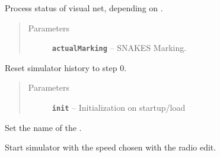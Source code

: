 \documentclass[a4paper,10pt,english]{sphinxmanual}
\begin{document}
\begin{fulllineitems}
\begin{fulllineitems}
\end{fulllineitems}


\begin{fulllineitems}
\label{model_link:model.CPNSimulator.CPNSimulator.getActualMarking}
Process status of visual net, depending on .
\begin{quote}\begin{description}
\item[{Parameters}] \leavevmode
\textbf{\texttt{actualMarking}} -- SNAKES Marking.

\end{description}\end{quote}

\end{fulllineitems}


\begin{fulllineitems}
\label{model_link:model.CPNSimulator.CPNSimulator.resetSimulator}
Reset simulator history to step 0.
\begin{quote}\begin{description}
\item[{Parameters}] \leavevmode
\textbf{\texttt{init}} -- Initialization on startup/load

\end{description}\end{quote}

\end{fulllineitems}


\begin{fulllineitems}
\label{model_link:model.CPNSimulator.CPNSimulator.setNetName}
Set the name of the .

\end{fulllineitems}


\begin{fulllineitems}
\label{model_link:model.CPNSimulator.CPNSimulator.startSim}
Start simulator with the speed chosen with the radio edit.


\end{fulllineitems}
\end{fulllineitems}
\end{document}

